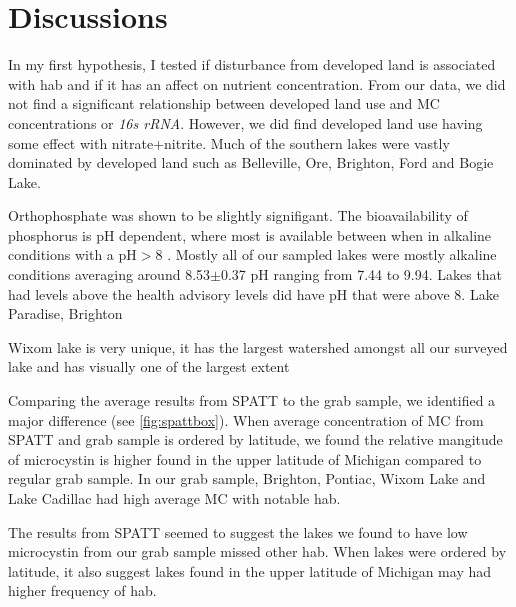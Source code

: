 \section{Discussions}


In my first hypothesis, I tested if disturbance from developed land is associated with \gls{hab} and if it has an affect on nutrient concentration.  From our data, we did not find a significant relationship between developed land use and MC concentrations or \emph{16s rRNA}. However, we did find developed land use having some effect with nitrate+nitrite. 
Much of the southern lakes were vastly dominated by developed land such as Belleville, Ore, Brighton, Ford and Bogie Lake. 


Orthophosphate was shown to be slightly signifigant. The bioavailability of phosphorus is pH dependent, where most is available between when in alkaline conditions with a pH$>$8 \cite{lucas_relationships_1961}.
Mostly all of our sampled lakes were mostly alkaline conditions averaging around 8.53$\pm$0.37 pH ranging from 7.44 to 9.94. Lakes that had levels above the health advisory levels did have pH that were above 8. Lake Paradise, Brighton %

Wixom lake is very unique, it has the largest watershed amongst all our surveyed lake and has visually one of the largest extent


Comparing the average results from SPATT to the grab sample, we identified a major difference (see \ref{fig:spattbox}). When average concentration of MC from SPATT and grab sample is ordered by latitude, we found the relative mangitude of microcystin is higher found in the upper latitude of Michigan compared to regular grab sample. In our grab sample, Brighton, Pontiac, Wixom Lake and Lake Cadillac had high average MC with notable \gls{hab}.

The results from SPATT seemed to suggest the lakes we found to have low microcystin from our grab sample missed other \gls{hab}. When lakes were ordered by latitude, it also suggest lakes found in the upper latitude of Michigan may had higher frequency of \gls{hab}.

